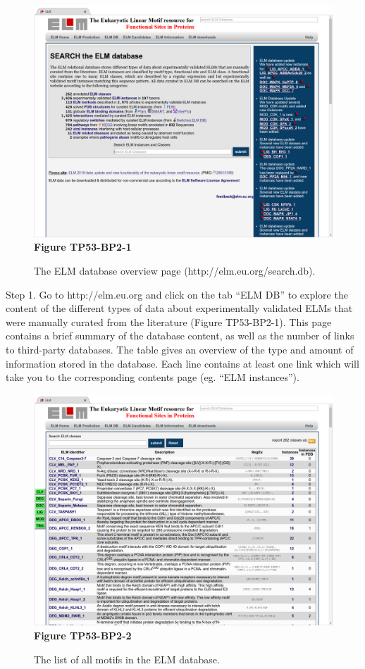 \begin{figure}[h!]
\centering
\includegraphics[width=\textwidth]{Figures/TP53_2/stats.png} \textbf{Figure TP53-BP2-1}
\caption{
The ELM database overview page (http://elm.eu.org/search.db).
}
\end{figure}

Step 1. Go to http://elm.eu.org and click on the tab ``ELM DB'' to
explore the content of the different types of data about experimentally
validated ELMs that were manually curated from the literature (Figure
TP53-BP2-1). This page contains a brief summary of the database content,
as well as the number of links to third-party databases. The table gives
an overview of the type and amount of information stored in the
database. Each line contains at least one link which will take you to
the corresponding contents page (eg. ``ELM instances'').

\begin{figure}[h!]
\centering
\includegraphics[width=\textwidth]{Figures/TP53_2/elms.png} \textbf{Figure TP53-BP2-2}
\caption{
The list of all motifs in the ELM database.
}
\end{figure}

